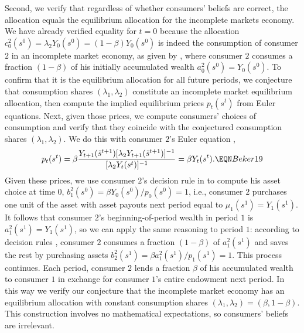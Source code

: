 Second, we verify that  regardless of whether
consumers' beliefs are correct, the  allocation equals the equilibrium allocation for the incomplete markets economy. We have already verified
equality for $t=0$
because the  allocation $c^2_0(s^0)=\lambda_2 Y_0(s^0)
= (1-\beta) Y_0(s^0)$ is indeed the consumption of consumer $2$ in
an incomplete market economy, as given by , where
consumer $2$ consumes a fraction $(1-\beta)$ of his initially
accumulated wealth $a^2_0(s^0)=Y_0(s^0)$. To confirm that it is the equilibrium allocation
for all future periods, we conjecture that consumption shares
$(\lambda_1, \lambda_2)$ constitute an incomplete market equilibrium allocation,
then compute the implied equilibrium prices $p_t(s^t)$ from
Euler equations. Next, given those prices, we compute consumers' choices
of consumption and verify that they coincide with the conjectured
consumption shares $(\lambda_1, \lambda_2)$. We do this
with consumer $2$'s Euler equation ,
$$
p_t(s^t) = \beta {Y_{t+1}(\tilde s^{t+1}) [\lambda_2 Y_{t+1}(\tilde s^{t+1})]^{-1}
         \over [\lambda_2 Y_t(s^t)]^{-1} } = \beta Y_t(s^t).   \EQN Beker19
$$
Given these prices,
we use consumer $2$'s decision rule in  to compute his
asset choice at time $0$, $b^2_1(s^0) = \beta Y_0(s^0)/p_0(s^0) = 1$,
i.e., consumer $2$ purchases one unit of the asset with asset payouts
next period equal to $\mu_1(s^1) = Y_1(s^1)$. It follows that
consumer $2$'s beginning-of-period wealth in period $1$ is
$a^2_1(s^1)=Y_1(s^1)$,
so we can apply the same  reasoning to period $1$:
according to decision rules , consumer $2$ consumes a fraction
$(1-\beta)$ of $a^2_1(s^1)$ and saves the rest by purchasing
assets $b^2_2(s^1)= \beta a^2_1(s^1)/p_1(s^1)=1$. This process  continues.
Each period, consumer $2$ lends
a fraction $\beta$ of his accumulated wealth to consumer $1$ in exchange
for consumer $1$'s entire endowment  next period. In this way we  verify
our conjecture that the incomplete market economy has an equilibrium
allocation with constant consumption shares
$(\lambda_1, \lambda_2)=(\beta, 1-\beta)$. This construction involves
no mathematical expectations, so  consumers' beliefs are irrelevant.

